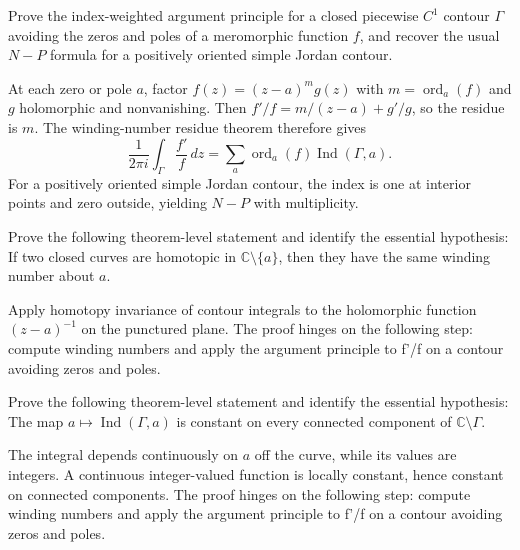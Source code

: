 \begin{problem}\label{prob:iv12-problem-09}
Prove the index-weighted argument principle for a closed piecewise $C^1$ contour $\Gamma$ avoiding the zeros and poles of a meromorphic function $f$, and recover the usual $N-P$ formula for a positively oriented simple Jordan contour.
\end{problem}
\begin{solution}
At each zero or pole $a$, factor $f(z)=(z-a)^m g(z)$ with $m=\operatorname{ord}_a(f)$ and $g$ holomorphic and nonvanishing. Then $f'/f=m/(z-a)+g'/g$, so the residue is $m$. The winding-number residue theorem therefore gives
\[
\frac{1}{2\pi i}\int_\Gamma \frac{f'}{f}\,dz
=\sum_a \operatorname{ord}_a(f)\operatorname{Ind}(\Gamma,a).
\]
For a positively oriented simple Jordan contour, the index is one at interior points and zero outside, yielding $N-P$ with multiplicity.
\end{solution}

\begin{problem}\label{prob:iv12-problem-10}
Prove the following theorem-level statement and identify the essential hypothesis: If two closed curves are homotopic in $\mathbb C\setminus\{a\}$, then they have the same winding number about $a$.
\end{problem}
\begin{solution}
Apply homotopy invariance of contour integrals to the holomorphic function $(z-a)^{-1}$ on the punctured plane. The proof hinges on the following step: compute winding numbers and apply the argument principle to f'/f on a contour avoiding zeros and poles.
\end{solution}

\begin{problem}\label{prob:iv12-problem-11}
Prove the following theorem-level statement and identify the essential hypothesis: The map $a\mapsto\operatorname{Ind}(\Gamma,a)$ is constant on every connected component of $\mathbb C\setminus\Gamma$.
\end{problem}
\begin{solution}
The integral depends continuously on $a$ off the curve, while its values are integers. A continuous integer-valued function is locally constant, hence constant on connected components. The proof hinges on the following step: compute winding numbers and apply the argument principle to f'/f on a contour avoiding zeros and poles.
\end{solution}

